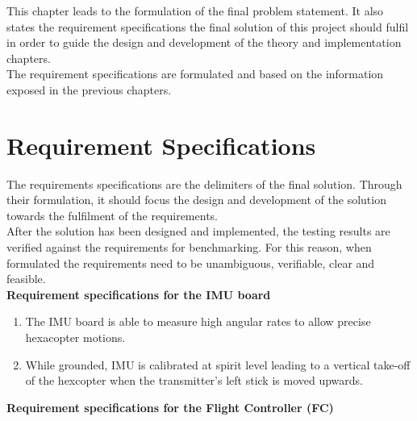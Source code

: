 \label{chapter:final_prob_statement}
\noindent This chapter leads to the formulation of the final problem statement. It also states the requirement specifications the final solution of this project should fulfil in order to guide the design and development of the theory and implementation chapters. \\

\noindent The requirement specifications are formulated and based on the information exposed in the previous chapters.

\section{Requirement Specifications}

The requirements specifications are the delimiters of the final solution. Through their formulation, it should focus the design and development of the solution towards the fulfilment of the requirements. \\


\noindent After the solution has been designed and implemented, the testing results are verified against the requirements for benchmarking. For this reason, when formulated the requirements need to be unambiguous, verifiable, clear and feasible.\\


\noindent \textbf{Requirement specifications for the IMU board}

\begin{enumerate}
    \item The IMU board is able to measure high angular rates to allow precise hexacopter motions. 
    \item While grounded, IMU is calibrated at spirit level leading to a vertical take-off of the hexcopter when the transmitter's left stick is moved upwards. 
\end{enumerate}


\noindent \textbf{Requirement specifications for the Flight Controller (FC)}

